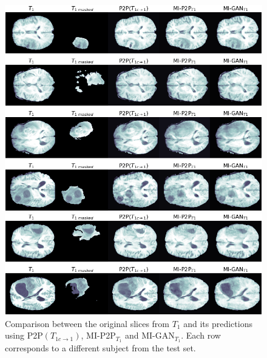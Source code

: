 
\newpage
\begin{figure}[H]
\centering

\vspace{20mm}

\includegraphics[width=0.635\textheight]{images/gen_t1.1.pdf}

\vspace{2mm}

\includegraphics[width=0.635\textheight]{images/gen_t1.2.pdf}
\caption[Qualitative results from the generation of $T_{1}$]{Comparison between the original slices from $T_{1}$ and its predictions using P2P$(T_{1c \rightarrow 1})$, MI-P2P{$_{T_{1}}$} and MI-GAN{$_{T_{1}}$}. Each row corresponds to a different subject from the test set.}
\label{fig:t1_gen}
\end{figure}

